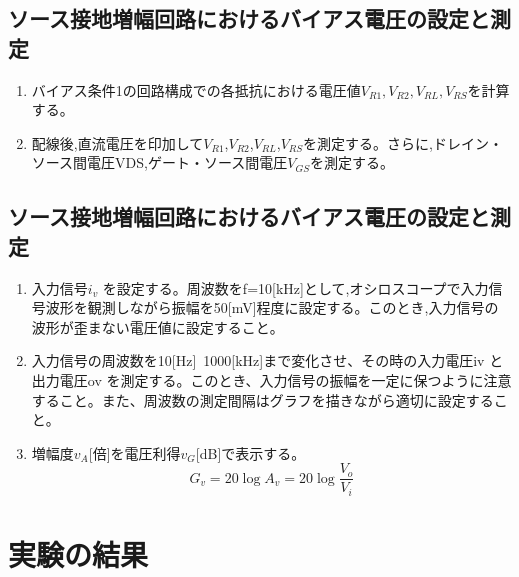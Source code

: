\documentclass[a4paper,11pt,xelatex,ja=standard]{bxjsarticle}
\begin{document}
    \subsection{ソース接地増幅回路におけるバイアス電圧の設定と測定}
        \begin{enumerate}
            \item バイアス条件1の回路構成での各抵抗における電圧値$V_{R1},V_{R2},V_{RL},V_{RS}$を計算する。
            \item 配線後,直流電圧を印加して$V_{R1}$,$V_{R2}$,$V_{RL}$,$V_{RS}$を測定する。さらに,ドレイン・ソース間電圧VDS,ゲート・ソース間電圧$V_{GS}$を測定する。
        \end{enumerate}
    
    \subsection{ソース接地増幅回路におけるバイアス電圧の設定と測定}
        \begin{enumerate}
            \item 入力信号$i_v$ を設定する。周波数をf=10[kHz]として,オシロスコープで入力信号波形を観測しながら振幅を50[mV]程度に設定する。このとき,入力信号の波形が歪まない電圧値に設定すること。
            \item 入力信号の周波数を10[Hz]~1000[kHz]まで変化させ、その時の入力電圧iv と出力電圧ov を測定する。このとき、入力信号の振幅を一定に保つように注意すること。また、周波数の測定間隔はグラフを描きながら適切に設定すること。
            \item 増幅度$v_A$[倍]を電圧利得$v_G$[dB]で表示する。
                \[G_v = 20 \log A_v = 20 \log \frac{V_o}{V_i}\]
        \end{enumerate}

\section{実験の結果}
\end{document}
